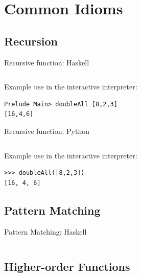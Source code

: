 \documentclass[mathserif]{beamer}
\begin{document}
\section{Common Idioms}
\subsection{Recursion}

\begin{frame}[fragile]{Recursive function: Haskell}

  \inputminted[fontsize=\Large,lastline=3]{haskell}{code/haskell/doubleall_recursion.hs}

  \vskip5mm

Example use in the interactive interpreter:
  \begin{verbatim}
Prelude Main> doubleAll [8,2,3]
[16,4,6]
  \end{verbatim}

\end{frame}

\begin{frame}[fragile]{Recursive function: Python}

  \inputminted[fontsize=\large,firstline=3,lastline=9]{python}{code/python/doubleall_recursion.py}

  \vskip5mm

Example use in the interactive interpreter:

  \begin{verbatim}
>>> doubleAll([8,2,3])
[16, 4, 6]
  \end{verbatim}

\end{frame}

\subsection{Pattern Matching}

\begin{frame}{Pattern Matching: Haskell}

  \inputminted[fontsize=\Large,lastline=3]{haskell}{code/haskell/doubleall_recursion.hs}

\end{frame}

\subsection{Higher-order Functions}
\end{document}
